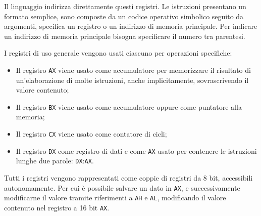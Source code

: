 \documentclass{article}
\numberwithin{equation}{subsection}
\begin{document}
Il linguaggio indirizza direttamente questi registri. Le istruzioni presentano un formato semplice, sono composte da un codice operativo simbolico seguito da argomenti, 
specifica un registro o un indirizzo di memoria principale. Per indicare un indirizzo di memoria principale bisogna specificare il numero tra parentesi. 

I registri di uso generale vengono usati ciascuno per operazioni specifiche:
\begin{itemize}
    \item Il registro \verb|AX| viene usato come accumulatore per memorizzare il risultato di un'elaborazione di molte istruzioni, anche implicitamente, sovrascrivendo il valore contenuto;
    \item Il registro \verb|BX| viene usato come accumulatore oppure come puntatore alla memoria;
    \item Il registro \verb|CX| viene usato come contatore di cicli;
    \item Il registro \verb|DX| come registro di dati e come \verb|AX| usato per contenere le istruzioni lunghe due parole: \verb|DX|:\verb|AX|. 
\end{itemize}

Tutti i registri vengono rappresentati come coppie di registri da 8 bit, accessibili autonomamente. Per cui è possibile salvare un dato in \verb|AX|, e successivamente modificarne 
il valore tramite riferimenti a \verb|AH| e \verb|AL|, modificando il valore contenuto nel registro a 16 bit \verb|AX|. 
\end{document}

